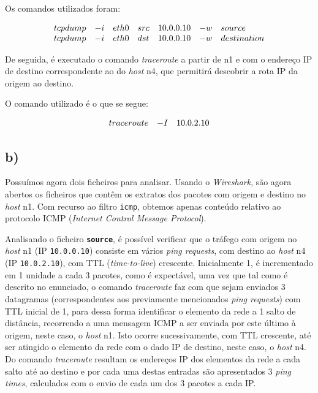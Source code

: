 \documentclass{llncs}
\begin{document}
Os comandos utilizados foram:

\[
    \begin{array}{l l l l l l l}
        tcpdump&-i &eth0 &src &10.0.0.10 &-w &source \\
        tcpdump&-i &eth0 &dst &10.0.0.10 &-w &destination
    \end{array}
\]

De seguida, é executado o comando \textit{traceroute} a partir de n1 e com o endereço IP de destino correspondente ao do \textit{host} n4, que permitirá descobrir a rota IP da origem ao destino.

O comando utilizado é o que se segue:

\[
	\begin{array}{l l l l l l l}
		traceroute&-I&10.0.2.10
	\end{array}
\]

\setlength{\voffset}{-0.45in}

\subsection*{b)}

Possuímos agora dois ficheiros para analisar. Usando o \textit{Wireshark}, são agora abertos os ficheiros que contêm os extratos dos pacotes com origem e destino no \textit{host} n1. Com recurso ao filtro \texttt{icmp}, obtemos apenas conteúdo relativo ao protocolo ICMP (\textit{Internet Control Message Protocol}).

Analisando o ficheiro \textbf{\texttt{source}}, é possível verificar que o tráfego com origem no \textit{host} n1 (IP \texttt{10.0.0.10}) consiste em vários \textit{ping requests}, com destino ao \textit{host} n4 (IP \texttt{10.0.2.10}), com TTL (\textit{time-to-live}) crescente. Inicialmente 1, é incrementado em 1 unidade a cada 3 pacotes, como é expectável, uma vez que tal como é descrito no enunciado, o comando \textit{traceroute} faz com que sejam enviados 3 datagramas (correspondentes aos previamente mencionados \textit{ping requests}) com TTL inicial de 1, para dessa forma identificar o elemento da rede a 1 salto de distância, recorrendo a uma mensagem ICMP a ser enviada por este último à origem, neste caso, o \textit{host} n1. Isto ocorre sucessivamente, com TTL crescente, até ser atingido o elemento da rede com o dado IP de destino, neste caso, o \textit{host} n4. Do comando \textit{traceroute} resultam os endereços IP dos elementos da rede a cada salto até ao destino e por cada uma destas entradas são apresentados 3 \textit{ping times}, calculados com o envio de cada um dos 3 pacotes a cada IP.
\end{document}
